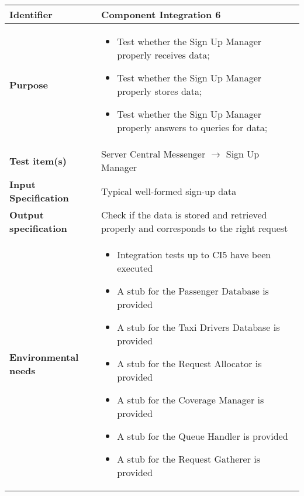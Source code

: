 \begin{center}
\begin{tabular}{lp{}}
\toprule
\textbf{Identifier}		&	Component Integration 6\\
\midrule
\textbf{Purpose}		&	\begin{itemize}
					\item Test whether the Sign Up Manager properly receives data;
					\item Test whether the Sign Up Manager properly stores data;
					\item Test whether the Sign Up Manager properly answers to queries for data;
					\end{itemize}	\\
\textbf{Test item(s)}	&	Server Central Messenger $\rightarrow$ Sign Up Manager\\
\textbf{Input Specification}	&	Typical well-formed sign-up data\\
\textbf{Output specification}	&	Check if the data is stored and retrieved properly and corresponds to the right request\\
\textbf{Environmental needs}	&	\begin{itemize}
							\item Integration tests up to CI5 have been executed
							\item A stub for the Passenger Database is provided
							\item A stub for the Taxi Drivers Database is provided											\item A stub for the Request Allocator is provided
							\item A stub for the Coverage Manager is provided
							\item A stub for the Queue Handler is provided
							\item A stub for the Request Gatherer is provided
							\end{itemize}	\\
\bottomrule
\end{tabular}
\end{center}



